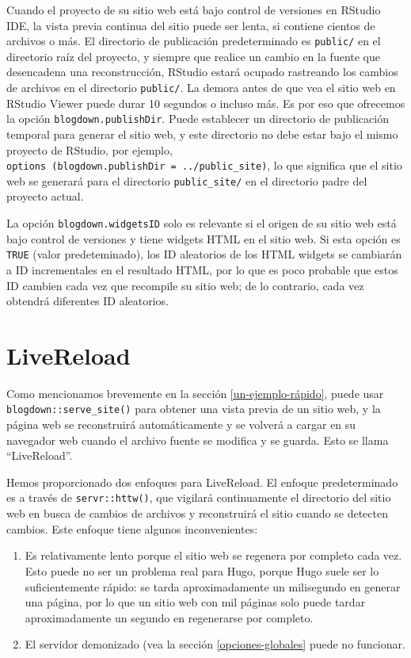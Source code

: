 \documentclass[12pt,]{krantz}
\theoremstyle{definition}
\theoremstyle{definition}
\theoremstyle{definition}
\theoremstyle{remark}
\begin{document}
Cuando el proyecto de su sitio web está bajo control de versiones en
RStudio IDE, la vista previa continua del sitio puede ser lenta, si
contiene cientos de archivos o más. El directorio de publicación
predeterminado es \texttt{public/} en el directorio raíz del proyecto, y
siempre que realice un cambio en la fuente que desencadena una
reconstrucción, RStudio estará ocupado rastreando los cambios de
archivos en el directorio \texttt{public/}. La demora antes de que vea
el sitio web en RStudio Viewer puede durar 10 segundos o incluso más. Es
por eso que ofrecemos la opción \texttt{blogdown.publishDir}. Puede
establecer un directorio de publicación temporal para generar el sitio
web, y este directorio no debe estar bajo el mismo proyecto de RStudio,
por ejemplo,
\texttt{options\ (blogdown.publishDir\ =\ \textquotesingle{}../public\_site\textquotesingle{})},
lo que significa que el sitio web se generará para el directorio
\texttt{public\_site/} en el directorio padre del proyecto actual.

La opción \texttt{blogdown.widgetsID} solo es relevante si el origen de
su sitio web está bajo control de versiones y tiene widgets HTML en el
sitio web. Si esta opción es \texttt{TRUE} (valor predeteminado), los ID
aleatorios de los HTML widgets se cambiarán a ID incrementales en el
resultado HTML, por lo que es poco probable que estos ID cambien cada
vez que recompile su sitio web; de lo contrario, cada vez obtendrá
diferentes ID aleatorios.

\hypertarget{livereload}{%
\section{LiveReload}\label{livereload}}

Como mencionamos brevemente  en la sección
\ref{un-ejemplo-rápido}, puede usar \texttt{blogdown::serve\_site()}
para obtener una vista previa de un sitio web, y la página web se
reconstruirá automáticamente y se volverá a cargar en su navegador web
cuando el archivo fuente se modifica y se guarda. Esto se llama
``LiveReload''.

Hemos proporcionado dos enfoques para LiveReload. El enfoque
predeterminado es a través de \texttt{servr::httw()}, que vigilará
continuamente el directorio del sitio web en busca de cambios de
archivos y reconstruirá el sitio cuando se detecten cambios. Este
enfoque tiene algunos inconvenientes:

\begin{enumerate}
\def\labelenumi{\arabic{enumi}.}
\item
  Es relativamente lento porque el sitio web se regenera por completo
  cada vez. Esto puede no ser un problema real para Hugo, porque Hugo
  suele ser lo suficientemente rápido: se tarda aproximadamente un
  milisegundo en generar una página, por lo que un sitio web con mil
  páginas solo puede tardar aproximadamente un segundo en regenerarse
  por completo.
\item
  El servidor demonizado (vea la sección \ref{opciones-globales} puede
  no funcionar.
\end{enumerate}
\end{document}
